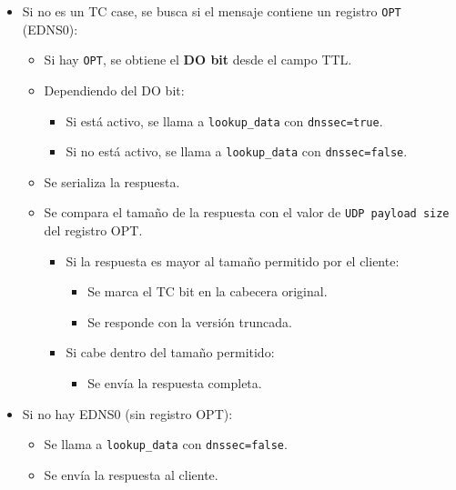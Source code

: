 \begin{itemize}
    \item Si no es un TC case, se busca si el mensaje contiene un registro \texttt{OPT} (EDNS0):
    \begin{itemize}
        \item Si hay \texttt{OPT}, se obtiene el \textbf{DO bit} desde el campo TTL.
        \item Dependiendo del DO bit:
        \begin{itemize}
            \item Si está activo, se llama a \texttt{lookup\_data} con \texttt{dnssec=true}.
            \item Si no está activo, se llama a \texttt{lookup\_data} con \texttt{dnssec=false}.
        \end{itemize}
        \item Se serializa la respuesta.
        \item Se compara el tamaño de la respuesta con el valor de \texttt{UDP payload size} del registro OPT.
        \begin{itemize}
            \item Si la respuesta es mayor al tamaño permitido por el cliente:
            \begin{itemize}
                \item Se marca el TC bit en la cabecera original.
                \item Se responde con la versión truncada.
            \end{itemize}
            \item Si cabe dentro del tamaño permitido:
            \begin{itemize}
                \item Se envía la respuesta completa.
            \end{itemize}
        \end{itemize}
    \end{itemize}

    \item Si no hay EDNS0 (sin registro OPT):
    \begin{itemize}
        \item Se llama a \texttt{lookup\_data} con \texttt{dnssec=false}.
        \item Se envía la respuesta al cliente.
    \end{itemize}
\end{itemize}
